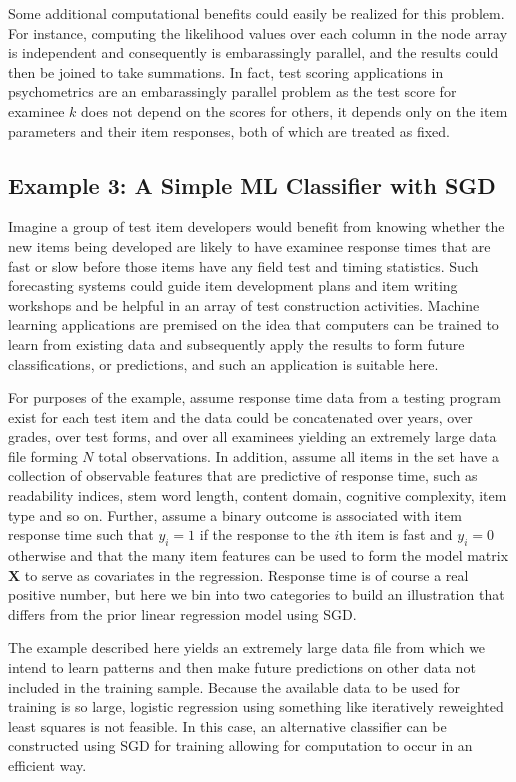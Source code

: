 \documentclass[12pt]{article}
\begin{document}
Some additional computational benefits could easily be realized for this problem. For instance, computing the likelihood values over each column in the node array is independent and consequently is embarassingly parallel, and the results could then be joined to take summations. In fact, test scoring applications in psychometrics are an embarassingly parallel problem as the test score for examinee $k$ does not depend on the scores for others, it depends only on the item parameters and their item responses, both of which are treated as fixed. 

\subsection*{Example 3: A Simple ML Classifier with SGD}

Imagine a group of test item developers would benefit from knowing whether the new items being developed are likely to have examinee response times that are fast or slow before those items have any field test and timing statistics. Such forecasting systems could guide item development plans and item writing workshops and be helpful in an array of test construction activities. Machine learning applications are premised on the idea that computers can be trained to learn from existing data and subsequently apply the results to form future classifications, or predictions, and such an application is suitable here.

For purposes of the example, assume response time data from a testing program exist for each test item and the data could be concatenated over years, over grades, over test forms, and over all examinees yielding an extremely large data file forming $N$ total observations. In addition, assume all items in the set have a collection of observable features that are predictive of response time, such as readability indices, stem word length, content domain, cognitive complexity, item type and so on. Further, assume a binary outcome is associated with item response time such that $y_{i} = 1$ if the response to the $i$th item is fast and $y_{i}=0$ otherwise and that the many item features can be used to form the model matrix $\bm{X}$ to serve as covariates in the regression. Response time is of course a real positive number, but here we bin into two categories to build an illustration that differs from the prior linear regression model using SGD.   

The example described here yields an extremely large data file from which we intend to learn patterns and then make future predictions on other data not included in the training sample. Because the available data to be used for training is so large, logistic regression using something like iteratively reweighted least squares is not feasible. In this case, an alternative classifier can be constructed using SGD for training allowing for computation to occur in an efficient way. 
\end{document}
